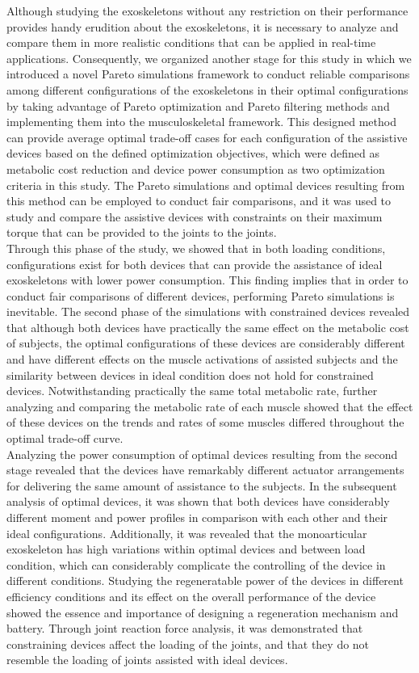 \documentclass[10pt,letterpaper]{article}
\begin{document}
Although studying the exoskeletons without any restriction on their performance provides handy erudition about the exoskeletons, it is necessary to analyze and compare them in more realistic conditions that can be applied in real-time applications. Consequently, we organized another stage for this study in which we introduced a novel Pareto simulations framework to conduct reliable comparisons among different configurations of the exoskeletons in their optimal configurations by taking advantage of Pareto optimization and Pareto filtering methods and implementing them into the musculoskeletal framework. This designed method can provide average optimal trade-off cases for each configuration of the assistive devices based on the defined optimization objectives, which were defined as metabolic cost reduction and device power consumption as two optimization criteria in this study. The Pareto simulations and optimal devices resulting from this method can be employed to conduct fair comparisons, and it was used to study and compare the assistive devices with constraints on their maximum torque that can be provided to the joints to the joints.\\
Through this phase of the study, we showed that in both loading conditions, configurations exist for both devices that can provide the assistance of ideal exoskeletons with lower power consumption. This finding implies that in order to conduct fair comparisons of different devices, performing Pareto simulations is inevitable. The second phase of the simulations with constrained devices revealed that although both devices have practically the same effect on the metabolic cost of subjects, the optimal configurations of these devices are considerably different and have different effects on the muscle activations of assisted subjects and the similarity between devices in ideal condition does not hold for constrained devices. Notwithstanding practically the same total metabolic rate, further analyzing and comparing the metabolic rate of each muscle showed that the effect of these devices on the trends and rates of some muscles differed throughout the optimal trade-off curve.\\
Analyzing the power consumption of optimal devices resulting from the second stage revealed that the devices have remarkably different actuator arrangements for delivering the same amount of assistance to the subjects. In the subsequent analysis of optimal devices, it was shown that both devices have considerably different moment and power profiles in comparison with each other and their ideal configurations. Additionally, it was revealed that the monoarticular exoskeleton has high variations within optimal devices and between load condition, which can considerably complicate the controlling of the device in different conditions. Studying the regeneratable power of the devices in different efficiency conditions and its effect on the overall performance of the device showed the essence and importance of designing a regeneration mechanism and battery. Through joint reaction force analysis, it was demonstrated that constraining devices affect the loading of the joints, and that they do not resemble the loading of joints assisted with ideal devices.\\
\end{document}
